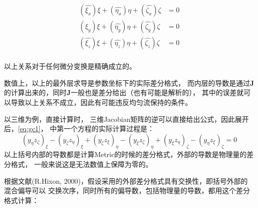 \documentclass[UTF8,zihao=5]{ctexart} %
\newcommand{\bm}[1]{{\mathbf{#1}}}
\begin{document}
\begin{equation}
    \begin{aligned}
        (\hat{\xi_x})\xi + (\hat{\eta_x})\eta + (\hat{\zeta_x })\zeta & = 0 \\
        (\hat{\xi_y})\xi + (\hat{\eta_y})\eta + (\hat{\zeta_y })\zeta & = 0 \\
        (\hat{\xi_z})\xi + (\hat{\eta_z})\eta + (\hat{\zeta_z })\zeta & = 0 \\
    \end{aligned}
    \label{eq:gc1}
\end{equation}

以上关系对于任何微分变换是精确成立的。

数值上，以上的最外层求导是参数坐标下的实际差分格式，
而内层的导数是通过$\bm{J}$的计算出来的，同时$\bm{J}$一般也是差分给出（也有可能是解析的），
其中的误差就可以导致以上关系不成立，因此有可能违反均匀流保持的条件。

以三维为例，直接计算时，
三维Jacobian矩阵的逆可以直接给出公式，因此展开后，\eqref{eq:gc1}，
中第一个方程的实际计算过程是：
\begin{equation}
    (y_\eta z_\zeta)_\xi -
    (y_\zeta z_\eta)_\xi
    +
    (y_\zeta z_\xi)_\eta -
    (y_\xi z_\zeta)_\eta
    +
    (y_\xi z_\eta)_\zeta -
    (y_\eta z_\xi)_\zeta = 0
\end{equation}
以上括号内部的导数都是计算Metric的时候的差分格式，外部的导数是物理量的差分格式，
一般来说这是无法数值上保障为零的。

根据文献(R.Hixon, 2000)，假设采用的外部差分格式具有交换性，即括号外部的混合偏导可以
交换次序，同时所有的偏导数，包括物理量的导数，都用这个差分格式计算：
\end{document}
